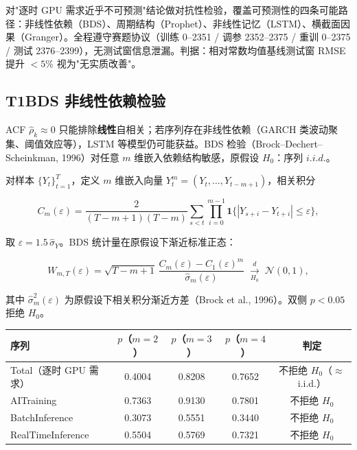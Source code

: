 \documentclass{internal-report}
\begin{document}
对"逐时 GPU 需求近乎不可预测"结论做对抗性检验，覆盖可预测性的四条可能路径：非线性依赖（BDS）、周期结构（Prophet）、非线性记忆（LSTM）、横截面因果（Granger）。全程遵守赛题协议（训练 0--2351 / 调参 2352--2375 / 重训 0--2375 / 测试 2376--2399），无测试窗信息泄漏。判据：相对常数均值基线测试窗 RMSE 提升 $<5\%$ 视为"无实质改善"。

\subsection{T1\quad BDS 非线性依赖检验}

ACF $\hat{\rho}_k \approx 0$ 只能排除\textbf{线性}自相关；若序列存在非线性依赖（GARCH 类波动聚集、阈值效应等），LSTM 等模型仍可能获益。BDS 检验（Brock--Dechert--Scheinkman, 1996）对任意 $m$ 维嵌入依赖结构敏感，原假设 $H_0$：序列 $i.i.d.$。

对样本 $\{Y_t\}_{t=1}^{T}$，定义 $m$ 维嵌入向量 $Y_t^m=(Y_t,\ldots,Y_{t-m+1})$，相关积分

\begin{equation}
  C_m(\varepsilon) = \frac{2}{(T-m+1)(T-m)}
    \sum_{s<t} \prod_{i=0}^{m-1} \mathbf{1}\bigl\{|Y_{s+i}-Y_{t+i}| \le \varepsilon\bigr\},
  \label{eq:bds_corr}
\end{equation}

取 $\varepsilon = 1.5\,\hat{\sigma}_Y$。BDS 统计量在原假设下渐近标准正态：

\begin{equation}
  W_{m,T}(\varepsilon) = \sqrt{T-m+1}\,
    \frac{C_m(\varepsilon) - C_1(\varepsilon)^{m}}{\hat{\sigma}_m(\varepsilon)}
  \;\xrightarrow[H_0]{d}\;\mathcal{N}(0,1),
  \label{eq:bds_stat}
\end{equation}

其中 $\hat{\sigma}_m^2(\varepsilon)$ 为原假设下相关积分渐近方差（Brock et al., 1996）。双侧 $p<0.05$ 拒绝 $H_0$。

\begin{center}
\footnotesize
\begin{tabular}{lcccc}
\toprule
序列 & $p$（$m=2$） & $p$（$m=3$） & $p$（$m=4$） & 判定 \\
\midrule
Total（逐时 GPU 需求） & 0.4004 & 0.8208 & 0.7652 & 不拒绝 $H_0$（$\approx$ i.i.d.） \\
AITraining & 0.7363 & 0.9130 & 0.7801 & 不拒绝 $H_0$ \\
BatchInference & 0.3073 & 0.5551 & 0.3440 & 不拒绝 $H_0$ \\
RealTimeInference & 0.5504 & 0.5769 & 0.7321 & 不拒绝 $H_0$ \\
\bottomrule
\end{tabular}
\end{center}
\end{document}

